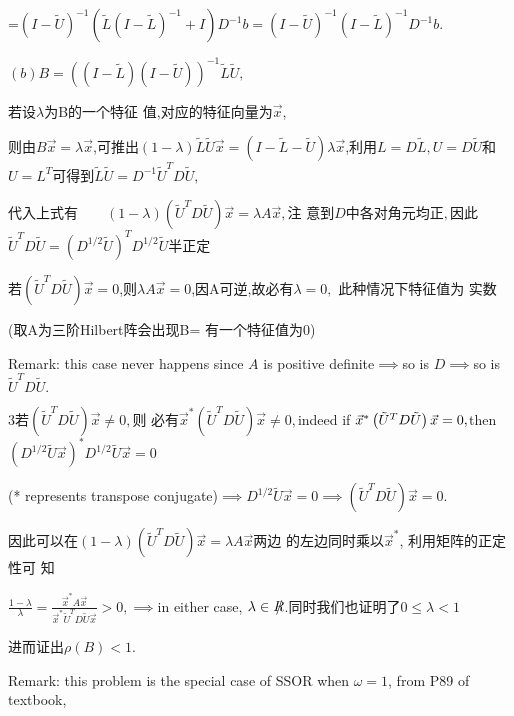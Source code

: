 \documentclass{article}
\begin{document}
=$\left( I-\tilde{U}\right) ^{-1}\left( \tilde{L}\left( I-\tilde{L}\right)
^{-1}+I\right) D^{-1}b=\left( I-\tilde{U}\right) ^{-1}\left( I-\tilde{L}%
\right) ^{-1}D^{-1}b.$

$\left( b\right) B=\left( \left( I-\tilde{L}\right) \left( I-\tilde{U}%
\right) \right) ^{-1}\tilde{L}\tilde{U},$

若设$\lambda $为B的一个特征%
值,对应的特征向量为$%
\vec{x}$,

则由$B\vec{x}=\lambda \vec{x}$,可推出$\left(
1-\lambda \right) \tilde{L}\tilde{U}\vec{x}=\left( I-\tilde{L}-\tilde{U}%
\right) \lambda \vec{x}$,利用$L=D\tilde{L},U=D\tilde{U}$和$%
U=L^{T}$可得到$\tilde{L}\tilde{U}=D^{-1}\tilde{U}^{T}D%
\tilde{U},$

代入上式有$\qquad \left( 1-\lambda \right)
\left( \tilde{U}^{T}D\tilde{U}\right) \vec{x}=\lambda A\vec{x},$注%
意到$D$中各对角元均正$%
, $因此$\tilde{U}^{T}D\tilde{U}=\left( D^{1/2}\tilde{U}\right)
^{T}D^{1/2}\tilde{U}$半正定

若$\left( \tilde{U}^{T}D\tilde{U}\right) \vec{x}=0$,则$\lambda A%
\vec{x}=0$,因A可逆,故必有$\lambda =0,$%
此种情况下特征值为%
实数

(取A为三阶Hilbert阵会出现B=%
有一个特征值为0)

Remark: this case never happens since $A$ is positive definite$\implies $so
is $D\implies $so is $\tilde{U}^{T}D\tilde{U}.$

3若$\left( \tilde{U}^{T}D\tilde{U}\right) \vec{x}\neq 0,$则%
必有$\vec{x}^{\ast }\left( \tilde{U}^{T}D\tilde{U}\right) \vec{x}%
\neq 0,$indeed if $\vec{x}^{\ast }\left( \tilde{U}^{T}D\tilde{U}\right) \vec{%
x}=0,$then $\left( D^{1/2}\tilde{U}\vec{x}\right) ^{\ast }D^{1/2}\tilde{U}%
\vec{x}=0$

(* represents transpose conjugate)$\implies D^{1/2}\tilde{U}\vec{x}%
=0\implies \left( \tilde{U}^{T}D\tilde{U}\right) \vec{x}=0.$

因此可以在$\left( 1-\lambda \right) \left( 
\tilde{U}^{T}D\tilde{U}\right) \vec{x}=\lambda A\vec{x}$两边%
的左边同时乘以$\vec{x}^{\ast }$,%
利用矩阵的正定性可%
知

$\frac{1-\lambda }{\lambda }=\frac{\vec{x}^{\ast }A\vec{x}}{\vec{x}^{\ast }%
\tilde{U}^{T}D\tilde{U}\vec{x}}>0,\implies $in either case, $\lambda \in \NEG%
{R}$.同时我们也证明了$0\leq
\lambda <1$

进而证出$\rho \left( B\right) <1.$

Remark: this problem is the special case of SSOR when $\omega =1$, from P89
of textbook,
\end{document}
